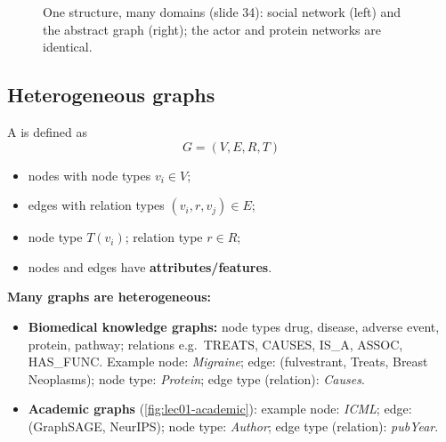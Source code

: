 \begin{figure}[htbp]
  \centering
  \caption{One structure, many domains (slide 34): social network (left) and the abstract
  graph (right); the actor and protein networks are identical.}\label{fig:lec01-common}
\end{figure}

\subsection{Heterogeneous graphs}\label{sec:lec01-hetero}

\begin{definition}\label{def:lec01-hetero}
  A  is defined as
  \begin{equation}\label{eq:lec01-hetero}
    G = (V, E, R, T)
  \end{equation}
  \begin{itemize}
    \item nodes with node types $v_i \in V$;
    \item edges with relation types $(v_i, r, v_j) \in E$;
    \item node type $T(v_i)$; relation type $r \in R$;
    \item nodes and edges have \textbf{attributes/features}.
  \end{itemize}
\end{definition}

\textbf{Many graphs are heterogeneous:}
\begin{itemize}
  \item \textbf{Biomedical knowledge graphs:} node types drug, disease, adverse event,
    protein, pathway; relations e.g.\ TREATS, CAUSES, IS\_A, ASSOC, HAS\_FUNC.
    Example node: \emph{Migraine}; edge: (fulvestrant, Treats, Breast Neoplasms); node type:
    \emph{Protein}; edge type (relation): \emph{Causes}.
  \item \textbf{Academic graphs} (\cref{fig:lec01-academic}): example node: \emph{ICML};
    edge: (GraphSAGE, NeurIPS); node type: \emph{Author}; edge type (relation):
    \emph{pubYear}.
\end{itemize}


